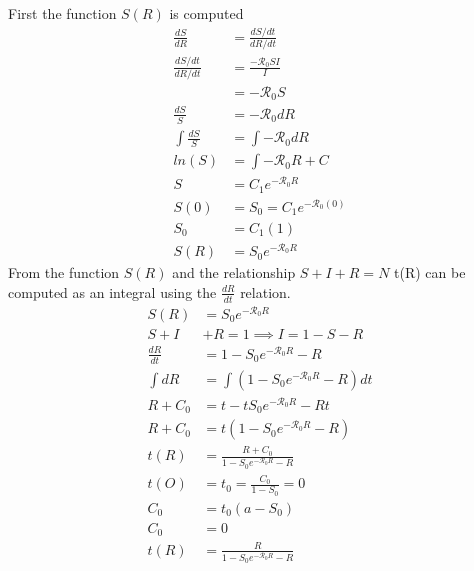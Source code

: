 First the function $S(R)$ is computed
\begin{align*}
    \frac{dS}{dR}       &= \frac{dS/dt}{dR/dt}\\
    \frac{dS/dt}{dR/dt} &= \frac{-{\mathcal R_0}SI}{I}\\
                        &= -{\mathcal R_0}S\\
    \frac{dS}{S}        &= -{\mathcal R_0}dR\\
    \int \frac{dS}{S}   &= \int -{\mathcal R_0}dR\\
    ln(S)               &= \int -{\mathcal R_0}R + C\\
    S                   &= C_1e^{-{\mathcal R_0}R}\\
    S(0)                &= S_0 = C_1e^{-{\mathcal R_0}(0)}\\
    S_0                 &= C_1(1)\\
    S(R)                &= S_0e^{-{\mathcal R_0}R}
\end{align*}
From the function $S(R)$ and the relationship $S+I+R=N$ t(R) can be computed as an integral using the $\frac{dR}{dt}$ relation.
\begin{align*}
    S(R) &= S_0e^{-{\mathcal R_0}R}\\
    S + I& + R = 1 \implies I = 1 - S - R\\
    \frac{dR}{dt} &= 1 - S_0e^{-{\mathcal R_0}R} - R\\
    \int dR &= \int (1 - S_0e^{-{\mathcal R_0}R} - R) dt\\
    R + C_0 &= t - tS_0e^{-{\mathcal R_0}R} - Rt\\
    R + C_0 &= t(1 - S_0e^{-{\mathcal R_0}R} - R)\\
    t(R)  &= \frac{R + C_0}{1 - S_0e^{-{\mathcal R_0}R} - R}\\
    t(O)  &= t_0 = \frac{C_0}{1 - S_0} = 0\\
    C_0   &= t_0(a-S_0)\\
    C_0   &= 0\\
    t(R)  &= \frac{R}{1 - S_0e^{-{\mathcal R_0}R} - R}
\end{align*}
